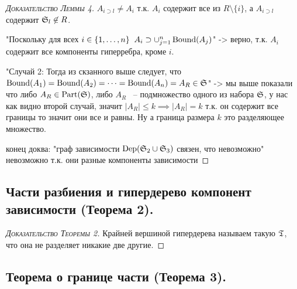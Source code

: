 \begin{proof}[\normalfont\textsc{Доказательство Леммы 4}]
	$A_{i \supset l} \neq A_i$ т.к. $A_i$ содержит все из $R \setminus \{i\}$, а  $A_{i \supset l}$ содержит $\S_l \not \in R$. 

	"Поскольку для всех $i \in \{1, \dots, n\} \; \; A_i \supset \cup_{j = 1}^{n}\Bound(A_j)$" -> верно, т.к. $A_i$ содержит все компоненты гиперребра, кроме  $i$.

	"Случай 2: Тогда из скзанного выше следует, что $\Bound(A_1) = \Bound(A_2) = \dots = \Bound(A_n) = A_R \in \S$" -> мы выше показали что либо $A_R \in \Part(\S)$, либо $A_R$ ~-- подмножество одного из набора  $\S$, у нас как видно второй случай, значит  $|A_R| \leq k \implies |A_R| = k$ т.к. он содержит все границы то значит они все и равны. Ну а граница размера  $k$ это разделяющее множество.

	конец доква: "граф зависимости $\Dep(\S_2 \cup \S_3)$ связен, что невозможно" невозможно т.к. они разные компоненты зависимости
\end{proof}

\subsection{Части разбиения и гипердерево компонент зависимости (Теорема 2).}

\begin{proof}[\normalfont\textsc{Доказательство Теоремы 2}]
	Крайней вершиной гипердерева называем такую $\T$, что она не разделяет никакие две другие.
\end{proof}

\subsection{Теорема о границе части (Теорема 3).}
